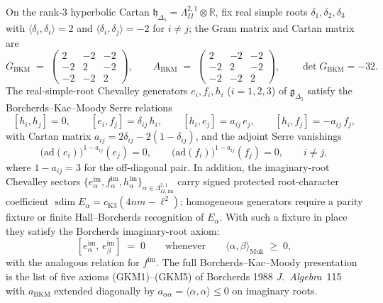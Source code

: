 \begin{theorem}
\label{thm:k3yang-chevalley-bkm-explicit}
On the rank-$3$ hyperbolic Cartan
$\mathfrak h_{\Delta_5} = \Lambda^{2,1}_{II}\otimes\mathbb R$, fix
real simple roots $\delta_1,\delta_2,\delta_3$ with
$\langle\delta_i,\delta_i\rangle = 2$ and
$\langle\delta_i,\delta_j\rangle = -2$ for $i\neq j$; the Gram matrix
and Cartan matrix are
\[
 G_{\mathrm{BKM}}
 \;=\;
 \begin{pmatrix}2 & -2 & -2 \\ -2 & 2 & -2 \\ -2 & -2 & 2\end{pmatrix},
 \qquad
 A_{\mathrm{BKM}}
 \;=\;
 \begin{pmatrix}2 & -2 & -2 \\ -2 & 2 & -2 \\ -2 & -2 & 2\end{pmatrix},
 \qquad
 \det G_{\mathrm{BKM}} = -32.
\]
The real-simple-root Chevalley generators $e_i,f_i,h_i$ ($i=1,2,3$)
of $\mathfrak{g}_{\Delta_5}$ satisfy the Borcherds--Kac--Moody Serre
relations
\begin{equation}
\label{eq:k3yang-serre-delta}
 [h_i,h_j] = 0,
 \qquad
 [e_i,f_j] = \delta_{ij}\,h_i,
 \qquad
 [h_i,e_j] = a_{ij}\,e_j,
 \qquad
 [h_i,f_j] = -a_{ij}\,f_j,
\end{equation}
with Cartan matrix $a_{ij} = 2\delta_{ij} - 2(1-\delta_{ij})$, and
the adjoint Serre vanishings
\begin{equation}
\label{eq:k3yang-serre-vanish}
 \bigl(\mathrm{ad}(e_i)\bigr)^{1-a_{ij}}(e_j) = 0,
 \qquad
 \bigl(\mathrm{ad}(f_i)\bigr)^{1-a_{ij}}(f_j) = 0,
 \qquad i\neq j,
\end{equation}
where $1 - a_{ij} = 3$ for the off-diagonal pair. In addition, the
imaginary-root Chevalley sectors
$\{e^{\mathrm{im}}_\alpha, f^{\mathrm{im}}_\alpha,
h^{\mathrm{im}}_\alpha\}_{\alpha\in\Lambda^{2,1}_{II,\,\mathrm{im}}}$
carry signed protected root-character coefficient
\(\operatorname{sdim}E_\alpha=c_{\mathrm{K3}}(4nm-\ell^2)\); homogeneous
generators require a parity fixture or finite Hall--Borcherds recognition
of \(E_\alpha\).  With such a fixture in place they
satisfy the Borcherds imaginary-root axiom:
\begin{equation}
\label{eq:k3yang-imag-comm}
 [e^{\mathrm{im}}_\alpha,\,e^{\mathrm{im}}_\beta] \;=\; 0
 \qquad\text{whenever}\qquad
 \langle\alpha,\beta\rangle_{\mathrm{Muk}} \;\geq\; 0,
\end{equation}
with the analogous relation for $f^{\mathrm{im}}$. The full
Borcherds--Kac--Moody presentation is the list of five axioms (GKM1)--(GKM5)
of Borcherds 1988 \emph{J.\ Algebra}~115 with $a_{\mathrm{BKM}}$ extended
diagonally by $a_{\alpha\alpha} = \langle\alpha,\alpha\rangle\leq 0$ on
imaginary roots.
\end{theorem}

